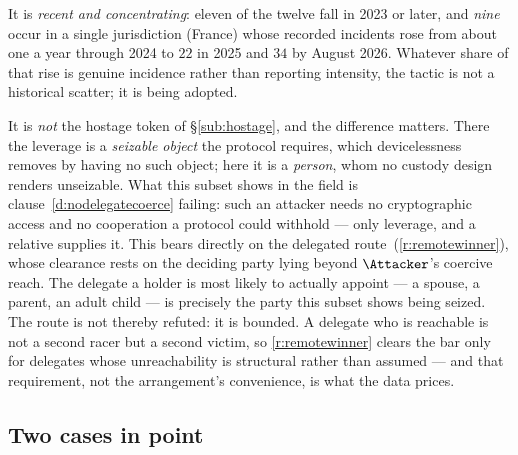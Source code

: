It is \emph{recent and concentrating}: eleven of the twelve fall in 2023 or later, and \emph{nine}
occur in a single jurisdiction (France) whose recorded incidents rose from about one a year through
2024 to $22$ in 2025 and $34$ by August 2026. Whatever share of that rise is genuine incidence
rather than reporting intensity, the tactic is not a historical scatter; it is being adopted.

It is \emph{not} the hostage token of \S\ref{sub:hostage}, and the difference matters. There the
leverage is a \emph{seizable object} the protocol requires, which devicelessness removes by having
no such object; here it is a \emph{person}, whom no custody design renders unseizable. What this
subset shows in the field is clause~\ref{d:nodelegatecoerce} failing: such an attacker needs no
cryptographic access and no cooperation a protocol could withhold --- only leverage, and a relative
supplies it. This bears directly on the delegated route~(\ref{r:remotewinner}), whose
clearance rests on the deciding party lying beyond $\Attacker$'s coercive reach. The delegate a
holder is most likely to actually appoint --- a spouse, a parent, an adult child --- is precisely
the party this subset shows being seized. The route is not thereby refuted: it is bounded. A
delegate who is reachable is not a second racer but a second victim, so \ref{r:remotewinner}
clears the bar only for delegates whose unreachability is structural rather than assumed --- and
that requirement, not the arrangement's convenience, is what the data prices.

\subsection{Two cases in point}
\label{app:classify-cases}


